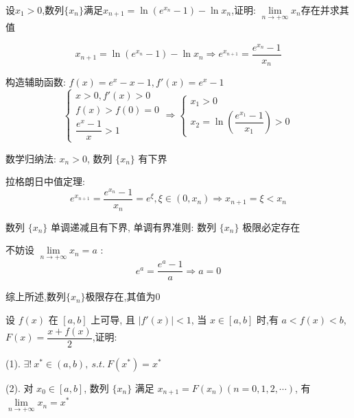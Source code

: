 \begin{proposition}
	设$x_{1}>0$,数列$\{x_{n}\}$满足$x_{n+1}=\ln(e^{x_{n}}-1)-\ln x_{n}$,证明:  $\lim\limits_{n\to +\infty}x_{n}$存在并求其值
\end{proposition}
\begin{solution}
	
	$$x_{n+1}=\ln(e^{x_{n}}-1)-\ln x_{n} \Rightarrow e^{x_{n+1}}=\dfrac{e^{x_{n}}-1}{x_{n}}$$
	
	构造辅助函数: $f(x)=e^x-x-1, f'(x)=e^{x}-1$
	$$\begin{cases}
		x > 0, f'(x) > 0\\
		f(x) > f(0) = 0\\
		\dfrac{e^{x}-1}{x} > 1
	\end{cases}\Rightarrow 
	\begin{cases}
		x_{1} > 0\\
		x_{2} = \ln(\dfrac{e^{x_{1}}-1}{x_{1}}) > 0
	\end{cases}
	$$
	
	数学归纳法: $x_{n}>0$, 数列 $\{ x_{n}\}$ 有下界
	
	拉格朗日中值定理:  
	$$e^{x_{n+1}}=\dfrac{e^{x_{n}}-1}{x_{n}}=e^{\xi}, \xi\in(0,x_{n})\Rightarrow x_{n+1} = \xi < x_{n}$$
	
	数列 $\{x_{n}\}$ 单调递减且有下界, 单调有界准则: 数列 $\{x_{n}\}$ 极限必定存在
	
	不妨设 $\lim\limits_{n\to +\infty}x_{n}=a$ :  
	$$e^{a}=\dfrac{e^a-1}{a}\Rightarrow a=0$$
	
	综上所述,数列$\{x_{n}\}$极限存在,其值为$0$
\end{solution}
\begin{proposition}
	设 $f(x)$ 在 $[a,b]$ 上可导, 且 $|f'(x)|<1$, 当 $x\in[a,b]$ 时,有 $a<f(x)<b$,$F(x)=\dfrac{x+f(x)}{2}$,证明:  

(1). $\exists!\ x^{*}\in(a,b),\ s.t.\ F(x^{*})=x^{*}$

(2). 对 $x_{0}\in[a,b]$, 数列 $\{x_{n}\}$ 满足 $x_{n+1}=F(x_{n})(n=0,1,2,\cdots)$, 有 $\lim\limits_{n\to+\infty}x_{n}=x^{*}$

\end{proposition}

